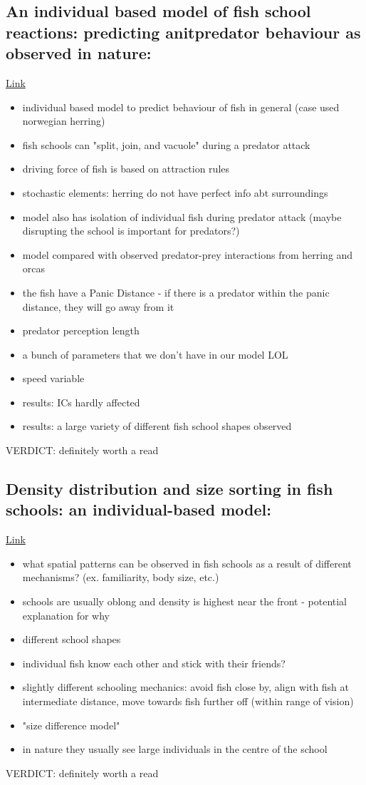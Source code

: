 \documentclass[12pt]{article}
\begin{document}
\subsection{An individual based model of fish school reactions: predicting anitpredator behaviour as observed in nature: \cite{vabo}}
\href{https://doi.org/10.1046/j.1365-2419.1997.00037.x}{Link}
\begin{itemize}
    \item individual based model to predict behaviour of fish in general (case used norwegian herring)
    \item fish schools can "split, join, and vacuole" during a predator attack
    \item driving force of fish is based on attraction rules
    \item stochastic elements: herring do not have perfect info abt surroundings
    \item model also has isolation of individual fish during predator attack (maybe disrupting the school is important for predators?)
    \item model compared with observed predator-prey interactions from herring and orcas
    \item the fish have a Panic Distance - if there is a predator within the panic distance, they will go away from it
    \item predator perception length
    \item a bunch of parameters that we don't have in our model LOL
    \item speed variable
    \item results: ICs hardly affected
    \item results: a large variety of different fish school shapes observed
\end{itemize}
VERDICT: definitely worth a read

\subsection{Density distribution and size sorting in fish schools: an individual-based model: \cite{hemelrijk}}
\href{https://doi.org/10.1093/beheco/arh149}{Link}
\begin{itemize}
    \item what spatial patterns can be observed in fish schools as a result of different mechanisms? (ex. familiarity, body size, etc.)
    \item schools are usually oblong and density is highest near the front - potential explanation for why
    \item different school shapes
    \item individual fish know each other and stick with their friends?
    \item slightly different schooling mechanics: avoid fish close by, align with fish at intermediate distance, move towards fish further off (within range of vision)
    \item "size difference model"
    \item in nature they usually see large individuals in the centre of the school
\end{itemize}
VERDICT: definitely worth a read
\end{document}
